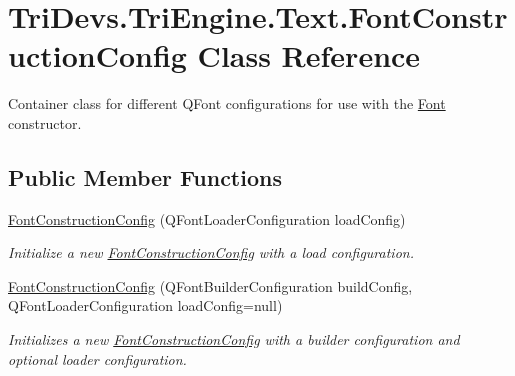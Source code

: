 \hypertarget{class_tri_devs_1_1_tri_engine_1_1_text_1_1_font_construction_config}{\section{Tri\-Devs.\-Tri\-Engine.\-Text.\-Font\-Construction\-Config Class Reference}
\label{class_tri_devs_1_1_tri_engine_1_1_text_1_1_font_construction_config}
}


Container class for different Q\-Font configurations for use with the \hyperlink{class_tri_devs_1_1_tri_engine_1_1_text_1_1_font}{Font} constructor.  


\subsection*{Public Member Functions}
\begin{DoxyCompactItemize}
\item 
\hyperlink{class_tri_devs_1_1_tri_engine_1_1_text_1_1_font_construction_config_a5846913131043b64ee8fa0bcd0c6b1b0}{Font\-Construction\-Config} (Q\-Font\-Loader\-Configuration load\-Config)
\begin{DoxyCompactList}\small\item\em Initialize a new \hyperlink{class_tri_devs_1_1_tri_engine_1_1_text_1_1_font_construction_config}{Font\-Construction\-Config} with a load configuration. \end{DoxyCompactList}\item 
\hyperlink{class_tri_devs_1_1_tri_engine_1_1_text_1_1_font_construction_config_a8e208c1f14fbb175cce6a0d7ea891c9a}{Font\-Construction\-Config} (Q\-Font\-Builder\-Configuration build\-Config, Q\-Font\-Loader\-Configuration load\-Config=null)
\begin{DoxyCompactList}\small\item\em Initializes a new \hyperlink{class_tri_devs_1_1_tri_engine_1_1_text_1_1_font_construction_config}{Font\-Construction\-Config} with a builder configuration and optional loader configuration. \end{DoxyCompactList}\end{DoxyCompactItemize}
